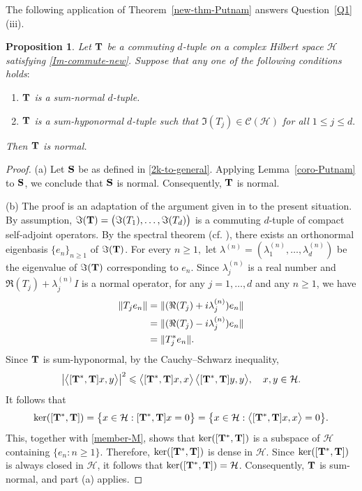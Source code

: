 \documentclass[10pt, a4paper, oneside, reqno]{amsproc}
\numberwithin{equation}{section}
\newtheorem{proposition}[theorem]{Proposition}
\theoremstyle{remark}
\theoremstyle{definition}
\newcommand*{\Ge}{\geqslant}
\newcommand*{\Le}{\leqslant}
\begin{document}
The following application of Theorem~\ref{new-thm-Putnam} answers Question~\ref{Q1}(iii).
\begin{proposition} 
\label{main-3-coro}
Let ${\bf T}$ be a commuting $d$-tuple on a complex Hilbert space $\mathcal H$ satisfying \eqref{Im-commute-new}. Suppose that any one of the following conditions holds$:$
\begin{enumerate}
\item[(a)] ${\bf T}$ is a sum-normal $d$-tuple.
\item[(b)] ${\bf T}$ is a sum-hyponormal $d$-tuple such that $\Im(T_j) \in \mathcal C(\mathcal H)$ for all $1 \Le j \Le d.$
\end{enumerate}
Then ${\bf T}$ is normal. 
\end{proposition}
\begin{proof}
(a) Let ${\bf S}$ be as defined in \eqref{2k-to-general}. Applying Lemma~\ref{coro-Putnam} to ${\bf S}$, we conclude that ${\bf S}$ is normal. Consequently, ${\bf T}$ is normal.

(b) The proof is an adaptation of the argument given in \cite{W1975} to the present situation. 
By assumption, $\Im({\bf T})=\big(\Im(T_1), \ldots, \Im(T_d)\big)$ is a commuting $d$-tuple of compact self-adjoint operators. By the spectral theorem (cf. \cite[Theorem~4.6]{B1996}), there exists an orthonormal eigenbasis $\{e_n\}_{n \Ge 1}$ of $\Im(\bf T)$. For every $n \Ge 1,$ let $\lambda^{(n)} = (\lambda^{(n)}_{1}, \ldots, \lambda^{(n)}_{d})$ be the eigenvalue of $\Im(\bf T)$ corresponding to $e_n$. 
Since $\lambda_j^{(n)}$ is a real number and $\Re(T_j)+\lambda_j^{(n)} I$ is a normal operator, for any $j=1, \ldots, d$ and any $n \Ge 1$, we have
\begin{align} 
 \notag
\|T_je_n\| &= \|(\Re(T_j)+ i \lambda_j^{(n)})e_n\| \\ \notag
& = \|(\Re(T_j)- i \lambda^{(n)}_j)e_n\| \\ 
&= \|T^*_je_n\|. \label{member-M}
\end{align} 
Since ${\bf T}$ is sum-hyponormal, by the Cauchy--Schwarz inequality, 
\[\big|\big \langle [{\bf T^*}, {\bf T}] x,y\big \rangle \big|^2 \Le \big\langle [{\bf T^*}, {\bf T}] x,x\big\rangle \, \big\langle [{\bf T^*}, {\bf T}] y, y\big\rangle, \quad x, y \in \mathcal H.\]  It follows that \[\ker([{\bf T^*}, {\bf T}])= \big\{x \in \mathcal H: [{\bf T^*}, {\bf T}] x= 0\big\} = \big\{x \in \mathcal H: \big \langle [{\bf T^*}, {\bf T}] x, x\big \rangle=0\big\}.\] This, together with \eqref{member-M}, shows that $\ker([{\bf T^*}, {\bf T}])$ is a subspace of $\mathcal H$ containing $\{e_n : n \Ge 1\}$. Therefore, $\ker([{\bf T^*}, {\bf T}])$ is dense in $\mathcal H$. 
Since $\ker([{\bf T^*}, {\bf T}])$ is always closed in $\mathcal H$, it follows that $\ker([{\bf T^*}, {\bf T}])=\mathcal H$. Consequently, ${\bf T}$ is sum-normal, and part (a) applies.
\end{proof}
\end{document}
